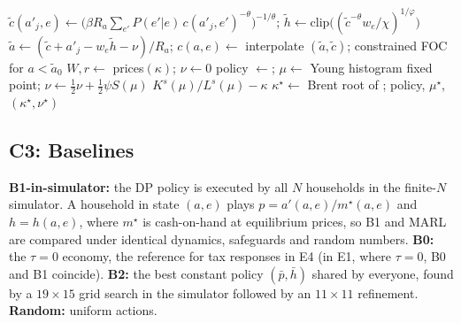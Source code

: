 \begin{algorithm}[t]
\caption{B1: stationary equilibrium with endogenous labour (EGM + histogram + Brent)}\label{alg:b1}
\small
\begin{algorithmic}[1]
 
\Repeat
  \State $\tilde c(a'_j,e)\gets\big(\beta R_a\sum_{e'}P(e'|e)\,c(a'_j,e')^{-\theta}\big)^{-1/\theta}$;\;
  $\tilde h\gets\mathrm{clip}\big((\tilde c^{-\theta}w_e/\chi)^{1/\varphi}\big)$
  \State $\tilde a\gets(\tilde c+a'_j-w_e\tilde h-\nu)/R_a$;\; $c(a,e)\gets$ interpolate $(\tilde a,\tilde c)$; constrained FOC for $a<\tilde a_0$
\EndFunction
{}
  \State $W,r\gets$ prices$(\kappa)$;\; $\nu\gets0$
  \Repeat\; policy $\gets$;\; $\mu\gets$ Young histogram fixed point;\; $\nu\gets\frac12\nu+\frac12\psi S(\mu)$
  \State \Return $K^s(\mu)/L^s(\mu)-\kappa$
\EndFunction
\State $\kappa^\star\gets$ Brent root of ;\; \Return policy, $\mu^\star$, $(\kappa^\star,\nu^\star)$
\end{algorithmic}
\end{algorithm}

\subsection{C3: Baselines}
\textbf{B1-in-simulator:} the DP policy is executed by all $N$ households in the finite-$N$ simulator. A household
in state $(a,e)$ plays $p=a'(a,e)/m^\star(a,e)$ and $h=h(a,e)$, where $m^\star$ is cash-on-hand at equilibrium
prices, so B1 and MARL are compared under identical dynamics, safeguards and random numbers.
\textbf{B0:} the $\tau=0$ economy, the reference for tax responses in E4 (in E1, where $\tau=0$, B0 and B1 coincide).
\textbf{B2:} the best constant policy $(\bar p,\bar h)$ shared by everyone, found by a $19\times15$ grid search in
the simulator followed by an $11\times11$ refinement. \textbf{Random:} uniform actions.

